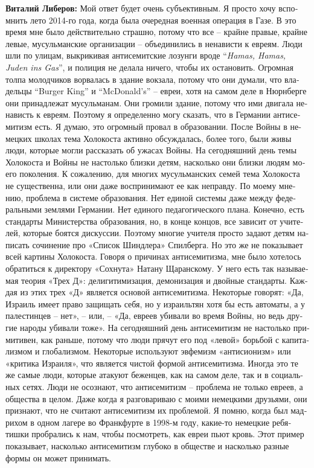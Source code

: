 \begin{otherlanguage}{russian}
	\textbf{Виталий Либеров:} Мой ответ будет очень субъективным. Я просто хочу вспомнить лето 2014-го года, когда была очередная военная операция в Газе. В это время мне было действительно страшно, потому что все – крайне правые, крайне левые, мусульманские организации – объединились в ненависти к евреям. Люди шли по улицам, выкрикивая антисемитские лозунги вроде ``\textit{Hamas, Hamas, Juden ins Gas}'', и полиция не делала ничего, чтобы их остановить. Огромная толпа молодчиков ворвалась в здание вокзала, потому что они думали, что владельцы ``Burger King''  и ``McDonald’s'' – евреи, хотя на самом деле в Нюрнберге они принадлежат мусульманам. Они громили здание, потому что ими двигала ненависть к евреям. Поэтому я определенно могу сказать, что в Германии антисемитизм есть. Я думаю, это огромный провал в образовании. После Войны в немецких школах тема Холокоста активно обсуждалась, более того, были живы люди, которые могли рассказать об ужасах Войны. На сегодняшний день темы Холокоста и Войны не настолько близки детям, насколько они близки людям моего поколения. К сожалению, для многих мусульманских семей тема Холокоста не существенна, или они даже воспринимают ее как неправду. По моему мнению, проблема в системе образования. Нет единой системы даже между федеральными землями Германии. Нет единого педагогического плана. Конечно, есть стандарты Министерства образования, но, в конце концов, все зависит от учителей, которые боятся дискуссии. Поэтому многие учителя просто задают детям написать сочинение про «Список Шиндлера» Спилберга. Но это же не показывает всей картины Холокоста. Говоря о причинах антисемитизма, мне было хотелось обратиться к директору «Сохнута» Натану Щаранскому. У него есть так называемая теория «Трех Д»: делигитимизация, демонизация и двойные стандарты. Каждая из этих трех «Д» является основой антисемитизма. Некоторые говорят: «Да, Израиль имеет право защищать себя, но у израильтян хотя бы есть автоматы, а у палестинцев – нет», – или, – «Да, евреев убивали во время Войны, но ведь другие народы убивали тоже». На сегодняшний день антисемитизм не настолько примитивен, как раньше, потому что люди прячут его под «левой» борьбой с капитализмом и глобализмом. Некоторые используют эвфемизм «антисионизм» или «критика Израиля», что является чистой формой антисемитизма. Иногда это те же самые люди, которые атакуют беженцев, как на самом деле, так и в социальных сетях. Люди не осознают, что антисемитизм – проблема не только евреев, а общества в целом. Даже когда я разговариваю с моими немецкими друзьями, они признают, что не считают антисемитизм их проблемой. Я помню, когда был мадрихом в одном лагере во Франкфурте в 1998-м году, какие-то немецкие ребятишки пробрались к нам, чтобы посмотреть, как евреи пьют кровь. Этот пример показывает, насколько антисемитизм глубоко в обществе и насколько разные формы он может принимать.  
	

\end{otherlanguage}
